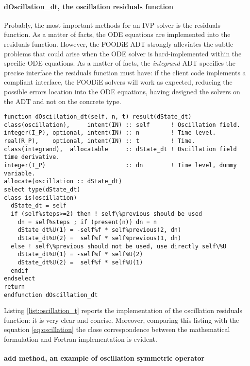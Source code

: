 \documentclass[pdftex,preprint,3p,times,numbers]{elsarticle}
\begin{document}
\paragraph{dOscillation\_dt, the oscillation residuals function}

Probably, the most important methods for an IVP solver is the residuals function. As a matter of facts, the ODE equations are implemented into the residuals function. However, the FOODiE ADT strongly alleviates the subtle problems that could arise when the ODE solver is hard-implemented within the specific ODE equations. As a matter of facts, the \emph{integrand} ADT specifies the precise interface the residuals function must have: if the client code implements a compliant interface, the FOODiE solvers will work as expected, reducing the possible errors location into the ODE equations, having designed the solvers on the ADT and not on the concrete type.

\begin{lstlisting}[firstnumber=1,style=code,caption={implementation of the \emph{oscillation integrand} residuals function},label={list:oscillation_t}]
function dOscillation_dt(self, n, t) result(dState_dt)
class(oscillation),     intent(IN) :: self      ! Oscillation field.
integer(I_P), optional, intent(IN) :: n         ! Time level.
real(R_P),    optional, intent(IN) :: t         ! Time.
class(integrand),  allocatable     :: dState_dt ! Oscillation field time derivative.
integer(I_P)                       :: dn        ! Time level, dummy variable.
allocate(oscillation :: dState_dt)
select type(dState_dt)
class is(oscillation)
  dState_dt = self
  if (self%steps>=2) then ! self\%previous should be used
    dn = self%steps ; if (present(n)) dn = n
    dState_dt%U(1) = -self%f * self%previous(2, dn)
    dState_dt%U(2) =  self%f * self%previous(1, dn)
  else ! self\%previous should not be used, use directly self\%U
    dState_dt%U(1) = -self%f * self%U(2)
    dState_dt%U(2) =  self%f * self%U(1)
  endif
endselect
return
endfunction dOscillation_dt
\end{lstlisting}

Listing \ref{list:oscillation_t} reports the implementation of the oscillation residuals function: it is very clear and concise. Moreover, comparing this listing with the equation \ref{eq:oscillation} the close correspondence between the mathematical formulation and Fortran implementation is evident.

\paragraph{add method, an example of oscillation symmetric operator}
\end{document}
